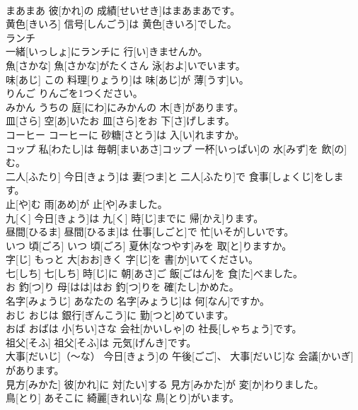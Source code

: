 \documentclass[8pt]{extreport}
\begin{document}
\begin{CJK}{UTF8}{min}
\\	まあまあ	彼[かれ]の 成績[せいせき]はまあまあです。		
\\	黄色[きいろ]	信号[しんごう]は 黄色[きいろ]でした。		
\\	ランチ
\\	一緒[いっしょ]にランチに 行[い]きませんか。		
\\	魚[さかな]	魚[さかな]がたくさん 泳[およ]いでいます。		
\\	味[あじ]	この 料理[りょうり]は 味[あじ]が 薄[うす]い。		
\\	りんご	りんごを1つください。		
\\	みかん	うちの 庭[にわ]にみかんの 木[き]があります。		
\\	皿[さら]	空[あ]いたお 皿[さら]をお 下[さ]げします。		
\\	コーヒー	コーヒーに 砂糖[さとう]は 入[い]れますか。		
\\	コップ	私[わたし]は 毎朝[まいあさ]コップ 一杯[いっぱい]の 水[みず]を 飲[の]む。		
\\	二人[ふたり]	今日[きょう]は 妻[つま]と 二人[ふたり]で 食事[しょくじ]をします。		
\\	止[や]む	雨[あめ]が 止[や]みました。		
\\	九[く]	今日[きょう]は 九[く] 時[じ]までに 帰[かえ]ります。		
\\	昼間[ひるま]	昼間[ひるま]は 仕事[しごと]で 忙[いそが]しいです。		
\\	いつ 頃[ごろ]	いつ 頃[ごろ] 夏休[なつやす]みを 取[と]りますか。		
\\	字[じ]	もっと 大[おお]きく 字[じ]を 書[か]いてください。		
\\	七[しち]	七[しち] 時[じ]に 朝[あさ]ご 飯[ごはん]を 食[た]べました。		
\\	お 釣[つ]り	母[はは]はお 釣[つ]りを 確[たし]かめた。		
\\	名字[みょうじ]	あなたの 名字[みょうじ]は 何[なん]ですか。		
\\	おじ	おじは 銀行[ぎんこう]に 勤[つと]めています。		
\\	おば	おばは 小[ちい]さな 会社[かいしゃ]の 社長[しゃちょう]です。		
\\	祖父[そふ]	祖父[そふ]は 元気[げんき]です。		
\\	大事[だいじ]（～な）	今日[きょう]の 午後[ごご]、 大事[だいじ]な 会議[かいぎ]があります。		
\\	見方[みかた]	彼[かれ]に 対[たい]する 見方[みかた]が 変[か]わりました。		
\\	鳥[とり]	あそこに 綺麗[きれい]な 鳥[とり]がいます。		

\end{CJK}
\end{document}

